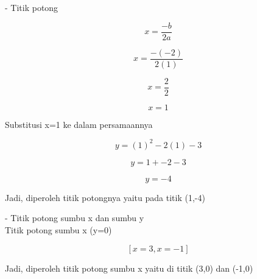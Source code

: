 \documentclass{article}
\begin{document}
\begin{eulernotebook}
\begin{eulercomment}
\begin{eulercomment}
\begin{eulercomment}
\begin{eulercomment}
\begin{eulercomment}
\begin{eulercomment}
\begin{eulercomment}
- Titik potong\\
\end{eulercomment}
\begin{eulerformula}
\[
x=\frac{-b}{2a}
\]
\end{eulerformula}
\begin{eulerformula}
\[
x=\frac{-(-2)}{2(1)}
\]
\end{eulerformula}
\begin{eulerformula}
\[
x=\frac{2}{2}
\]
\end{eulerformula}
\begin{eulerformula}
\[
x=1
\]
\end{eulerformula}
\begin{eulercomment}
Substitusi x=1 ke dalam persamaannya\\
\end{eulercomment}
\begin{eulerformula}
\[
y=(1)^2-2(1)-3
\]
\end{eulerformula}
\begin{eulerformula}
\[
y=1+{-2}-3
\]
\end{eulerformula}
\begin{eulerformula}
\[
y=-4
\]
\end{eulerformula}
\begin{eulercomment}
Jadi, diperoleh titik potongnya yaitu pada titik (1,-4)

- Titik potong sumbu x dan sumbu y\\
Titik potong sumbu x (y=0)
\end{eulercomment}
\begin{eulerformula}
\[
\left[ x=3 , x=-1 \right] 
\]
\end{eulerformula}
\begin{eulercomment}
Jadi, diperoleh titik potong sumbu x yaitu di titik (3,0) dan (-1,0)


\end{eulercomment}
\end{eulercomment}
\end{eulercomment}
\end{eulercomment}
\end{eulercomment}
\end{eulercomment}
\end{eulercomment}
\end{eulernotebook}
\end{document}
